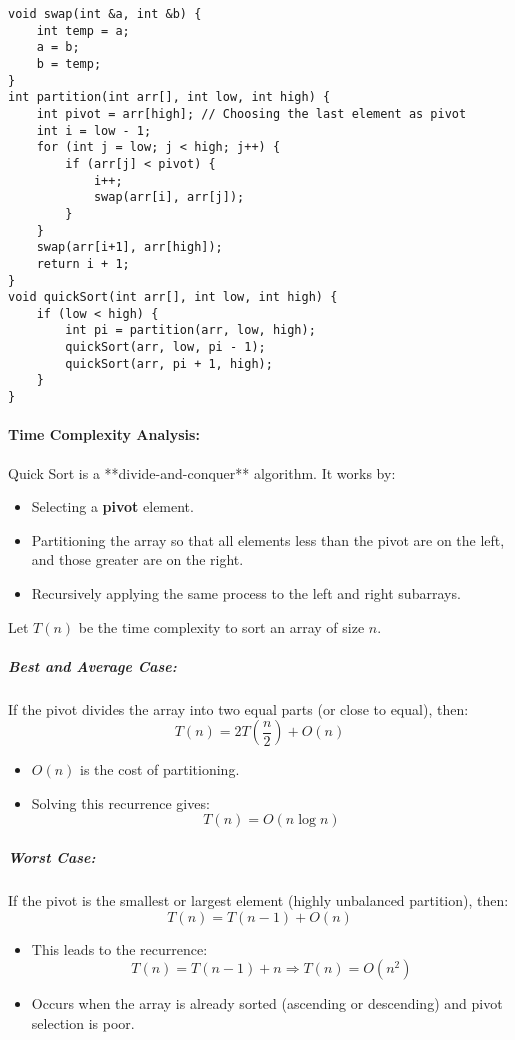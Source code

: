 \begin{lstlisting}[caption={Quick Sort in C++}]
void swap(int &a, int &b) {
    int temp = a;
    a = b;
    b = temp;
}
int partition(int arr[], int low, int high) {
    int pivot = arr[high]; // Choosing the last element as pivot
    int i = low - 1;
    for (int j = low; j < high; j++) {
        if (arr[j] < pivot) {
            i++;
            swap(arr[i], arr[j]);
        }
    }
    swap(arr[i+1], arr[high]);
    return i + 1;
}
void quickSort(int arr[], int low, int high) {
    if (low < high) {
        int pi = partition(arr, low, high);
        quickSort(arr, low, pi - 1);
        quickSort(arr, pi + 1, high);
    }
}
\end{lstlisting}
\paragraph{Time Complexity Analysis:}

Quick Sort is a **divide-and-conquer** algorithm. It works by:
\begin{itemize}
  \item Selecting a \textbf{pivot} element.
  \item Partitioning the array so that all elements less than the pivot are on the left, and those greater are on the right.
  \item Recursively applying the same process to the left and right subarrays.
\end{itemize}

Let \( T(n) \) be the time complexity to sort an array of size \( n \).

\subparagraph{Best and Average Case:}
If the pivot divides the array into two equal parts (or close to equal), then:
\[
T(n) = 2T\left(\frac{n}{2}\right) + O(n)
\]
\begin{itemize}
  \item \( O(n) \) is the cost of partitioning.
  \item Solving this recurrence gives:
\[
T(n) = O(n \log n)
\]
\end{itemize}

\subparagraph{Worst Case:}
If the pivot is the smallest or largest element (highly unbalanced partition), then:
\[
T(n) = T(n - 1) + O(n)
\]
\begin{itemize}
  \item This leads to the recurrence:
\[
T(n) = T(n - 1) + n \Rightarrow T(n) = O(n^2)
\]
\item Occurs when the array is already sorted (ascending or descending) and pivot selection is poor.
\end{itemize}

